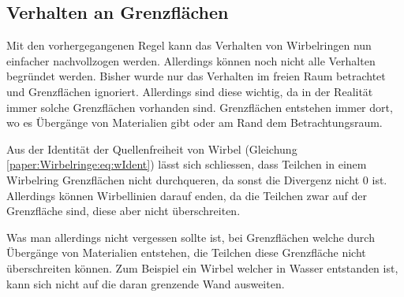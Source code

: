 \subsection{Verhalten an Grenzflächen \label{paper:Wirbelringe:Grenzflaechen}}

Mit den vorhergegangenen Regel kann das Verhalten von Wirbelringen nun einfacher nachvollzogen werden. 
Allerdings können noch nicht alle Verhalten begründet werden. 
Bisher wurde nur das Verhalten im freien Raum betrachtet und Grenzflächen ignoriert. 
Allerdings sind diese wichtig, da in der Realität immer solche Grenzflächen vorhanden sind. 
Grenzflächen entstehen immer dort, wo es Übergänge von Materialien gibt oder am Rand dem Betrachtungsraum.

Aus der Identität der Quellenfreiheit von Wirbel (Gleichung \ref{paper:Wirbelringe:eq:wIdent}) lässt sich schliessen, dass Teilchen in einem Wirbelring Grenzflächen nicht durchqueren, da sonst die Divergenz nicht \(0\) ist. 
Allerdings können Wirbellinien darauf enden, da die Teilchen zwar auf der Grenzfläche sind, diese aber nicht überschreiten. 

Was man allerdings nicht vergessen sollte ist, bei Grenzflächen welche durch Übergänge von Materialien entstehen, die Teilchen diese Grenzfläche nicht überschreiten können. 
Zum Beispiel ein Wirbel welcher in Wasser entstanden ist, kann sich nicht auf die daran grenzende Wand ausweiten.  
